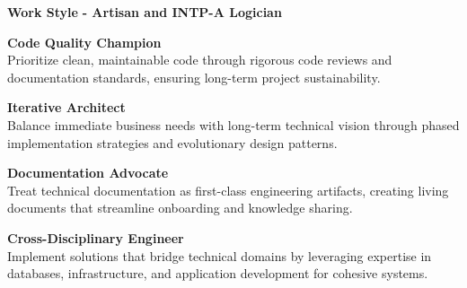 \documentclass[a4paper,10pt]{article}
\begin{document}
\vspace{0.7cm}
\noindent
\begin{minipage}{\textwidth}
	{\large\bfseries\color{darkblue}\selectfont Work Style}
	{\small\bfseries\color{darkblue}\selectfont - Artisan and INTP-A Logician}
	\vspace{0.5cm}

	\begin{minipage}{0.48\textwidth}
		\noindent\textbf{Code Quality Champion} \\
		Prioritize clean, maintainable code through rigorous code reviews and documentation standards, ensuring long-term project sustainability.

		\vspace{0.3cm}
		\noindent\textbf{Iterative Architect} \\
		Balance immediate business needs with long-term technical vision through phased implementation strategies and evolutionary design patterns.
	\end{minipage}
	\hfill
	\begin{minipage}{0.48\textwidth}
		\noindent\textbf{Documentation Advocate} \\
		Treat technical documentation as first-class engineering artifacts, creating living documents that streamline onboarding and knowledge sharing.

		\vspace{0.3cm}
		\noindent\textbf{Cross-Disciplinary Engineer} \\
		Implement solutions that bridge technical domains by leveraging expertise in databases, infrastructure, and application development for cohesive systems.
	\end{minipage}
\end{minipage}
\end{document}
